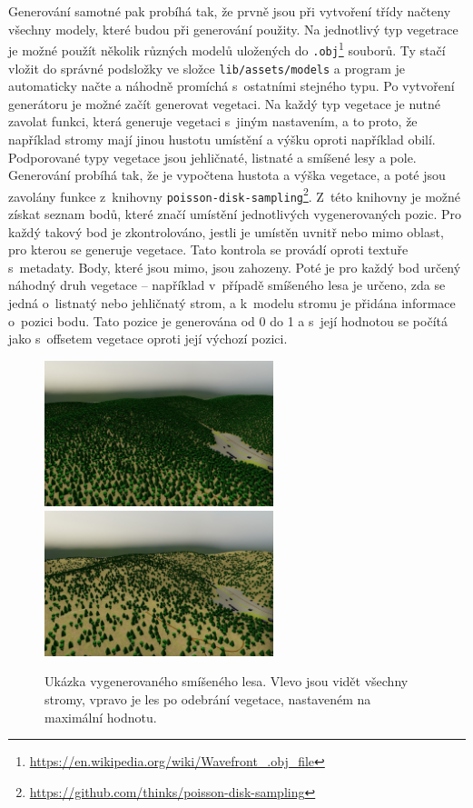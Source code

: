 Generování samotné pak probíhá tak, že prvně jsou při vytvoření třídy načteny všechny modely, které budou při generování použity. Na jednotlivý typ vegetrace je možné použít několik různých modelů uložených do \verb|.obj|\footnote{\href{https://en.wikipedia.org/wiki/Wavefront_.obj_file}{https://en.wikipedia.org/wiki/Wavefront\_.obj\_file}} souborů. Ty stačí vložit do správné podsložky ve složce \verb|lib/assets/models| a program je automaticky načte a náhodně promíchá s~ostatními stejného typu. Po vytvoření generátoru je možné začít generovat vegetaci. Na každý typ vegetace je nutné zavolat funkci, která generuje vegetaci s~jiným nastavením, a to proto, že například stromy mají jinou hustotu umístění a výšku oproti například obilí. Podporované typy vegetace jsou jehličnaté, listnaté a smíšené lesy a pole. Generování probíhá tak, že je vypočtena hustota a výška vegetace, a poté jsou zavolány funkce z~knihovny \verb|poisson-disk-sampling|\footnote{\href{https://github.com/thinks/poisson-disk-sampling}{https://github.com/thinks/poisson-disk-sampling}}. Z~této knihovny je možné získat seznam bodů, které značí umístění jednotlivých vygenerovaných pozic. Pro každý takový bod je zkontrolováno, jestli je umístěn uvnitř nebo mimo oblast, pro kterou se generuje vegetace. Tato kontrola se provádí oproti textuře s~metadaty. Body, které jsou mimo, jsou zahozeny. Poté je pro každý bod určený náhodný druh vegetace -- například v~případě smíšeného lesa je určeno, zda se jedná o~listnatý nebo jehličnatý strom, a k~modelu stromu je přidána informace o~pozici bodu. Tato pozice je generována od 0 do 1 a s~její hodnotou se počítá jako s~offsetem vegetace oproti její výchozí pozici.

\begin{figure}[H]
	\centering
	\includegraphics[width=18em]{images/impl/trees.png}
	\includegraphics[width=18em]{images/impl/trees_culled.png}
	\caption[caption]{Ukázka vygenerovaného smíšeného lesa. Vlevo jsou vidět všechny stromy, vpravo je les po odebrání vegetace, nastaveném na maximální hodnotu.} 
	\label{veg-gen}
\end{figure}


